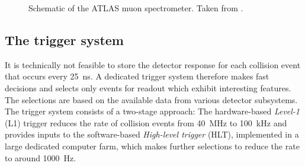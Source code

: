 
\FloatBarrier
\begin{figure}[t]
    \caption[Schematic of the ATLAS muon spectrometer.]{Schematic of the ATLAS muon spectrometer. Taken from .}
    \label{fig:ATLASmuonspectrometer}
\end{figure}



\subsection{The trigger system}
\label{sec:trigger-system}
It is technically not feasible to store the detector response for each collision event that occurs every \SI{25}{\nano\second}.
A dedicated trigger system therefore makes fast decisions and selects only events for readout which exhibit interesting features.
The selections are based on the available data from various detector subsystems.
The \RunTwo trigger system consists of a two-stage approach:
The hardware-based \emph{Level-1} (L1) trigger reduces the rate of collision events from \SI{40}{\mega\hertz} to \SI{100}{\kilo\hertz} and provides inputs to the software-based \emph{High-level trigger} (HLT), implemented in a large dedicated computer farm, which makes further selections to reduce the rate to around \SI{1000}{\hertz}.

